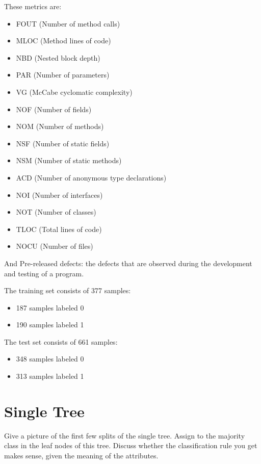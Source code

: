\documentclass[a4paper,11pt]{article}
\begin{document}
 These metrics are: 
 \begin{itemize}
 \item FOUT      (Number of method calls) 
 \item MLOC     (Method lines of code)
 \item NBD        (Nested block depth)
 \item PAR        (Number of parameters) 
 \item VG          (McCabe cyclomatic complexity)
 \item NOF        (Number of fields)
 \item NOM       (Number of methods) 
 \item NSF        (Number of static fields)
 \item NSM       (Number of static methods)
 \item ACD       (Number of anonymous type declarations)
 \item NOI        (Number of interfaces)
 \item NOT       (Number of classes)
 \item TLOC     (Total lines of code)
 \item NOCU    (Number of files)
 \end{itemize}
And Pre-released defects: the defects that are observed during the development and testing of a program. 

The training set consists of 377 samples:
\begin{itemize}
\item 187 samples labeled 0
\item 190 samples labeled 1
\end{itemize}

The test set consists of 661 samples:
\begin{itemize}
\item 348 samples labeled 0
\item 313 samples labeled 1
\end{itemize}

\section{Single Tree}
Give a picture of the first few splits of the single tree. Assign to the majority class in the leaf nodes of this tree. Discuss whether the classification rule you get makes sense, given the meaning of the attributes. 
\end{document}
